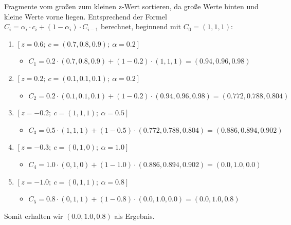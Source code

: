 \documentclass{article}
\begin{document}
Fragmente vom großen zum kleinen z-Wert sortieren, da große Werte hinten und kleine Werte vorne liegen.
Entsprechend der Formel $C_i = \alpha_i \cdot c_i + (1 - \alpha_i) \cdot C_{i-1}$ berechnet, beginnend mit $C_0 = (1,1,1)$: \\
\begin{enumerate}
     \item $[z = 0.6;\ c = (0.7, 0.8, 0.9);\ \alpha = 0.2]$
    \begin{itemize}
        \item $C_1 = 0.2 \cdot (0.7, 0.8, 0.9) + (1 - 0.2) \cdot (1, 1, 1) = (0.94, 0.96, 0.98)$
    \end{itemize}
    \item $[z = 0.2;\ c = (0.1, 0.1, 0.1);\ \alpha = 0.2]$
    \begin{itemize}
        \item $C_2 = 0.2 \cdot (0.1, 0.1, 0.1) + (1 - 0.2) \cdot (0.94, 0.96, 0.98) = (0.772, 0.788, 0.804)$
    \end{itemize}
    \item $[z = -0.2;\ c = (1, 1, 1);\ \alpha = 0.5]$
    \begin{itemize}
        \item $C_3 = 0.5 \cdot (1, 1, 1) + (1 - 0.5) \cdot (0.772, 0.788, 0.804) = (0.886, 0.894, 0.902)$
    \end{itemize}
    \item $[z = -0.3;\ c = (0, 1, 0);\ \alpha = 1.0]$
    \begin{itemize}
        \item $C_4 = 1.0 \cdot (0, 1, 0) + (1 - 1.0) \cdot (0.886, 0.894, 0.902) = (0.0, 1.0, 0.0)$
    \end{itemize}
    \item $[z = -1.0;\ c = (0, 1, 1);\ \alpha = 0.8]$
    \begin{itemize}
        \item $C_5 = 0.8 \cdot (0, 1, 1) + (1 - 0.8) \cdot (0.0, 1.0, 0.0) = (0.0, 1.0, 0.8)$
    \end{itemize}
\end{enumerate}
   
Somit erhalten wir $ (0.0, 1.0, 0.8)$ als Ergebnis.
\end{document}
